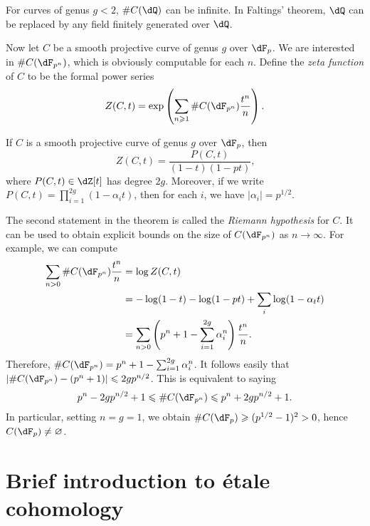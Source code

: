 \documentclass{article}
\begin{document}
For curves of genus $g<2$, $\# C(\dQ)$ can be infinite. In Faltings' 
theorem, $\dQ$ can be replaced by any field finitely generated over 
$\dQ$. 

Now let $C$ be a smooth projective curve of genus $g$ over $\dF_p$. 
We are interested in $\#C(\dF_{p^n})$, which is obviously computable 
for each $n$. Define the \emph{zeta function} of $C$ to be the formal power 
series 
\[
  Z(C,t) = \exp\left( \sum_{n\geqslant 1} \# C(\dF_{p^n}) \frac{t^n}{n} \right) \text{.}
\]

\begin{theorem}[Weil]\label{thm:Weil-curve}
If $C$ is a smooth projective curve of genus $g$ over $\dF_p$, then 
\[
  Z(C,t) = \frac{P(C,t)}{(1-t)(1-p t)} \text{,}
\]
where $P(C,t)\in \dZ[t]$ has degree $2 g$. Moreover, if we write
$P(C,t) = \prod_{i=1}^{2 g} (1-\alpha_i t)$, then for each $i$, we have 
$|\alpha_i|=p^{1/2}$. 
\end{theorem}

The second statement in the theorem is called the \emph{Riemann hypothesis} 
for $C$. It can be used to obtain explicit bounds on the size of 
$C(\dF_{p^n})$ as $n\to\infty$. For example, we can compute 
\begin{align*}
  \sum_{n>0} \# C(\dF_{p^n}) \frac{t^n}{n} 
    &= \log Z(C,t) \\
    &= -\log(1-t) - \log(1-p t) + \sum_i \log(1-\alpha_t t) \\
    &= \sum_{n>0} \left(p^n+1-\sum_{i=1}^{2 g} \alpha_i^n\right) \frac{t^n}{n} \text{.}
\end{align*}
Therefore, $\# C(\dF_{p^n}) = p^n+1-\sum_{i=1}^{2 g} \alpha_i^n$. It 
follows easily that $|\# C(\dF_{p^n})-(p^n+1)| \leqslant 2 g p^{n/2}$. 
This is equivalent to saying 
\[
  p^n-2 g p^{n/2}+1 
    \leqslant \# C(\dF_{p^n}) 
    \leqslant p^n + 2 g p^{n/2} + 1 \text{.}
\]
In particular, setting $n = g = 1$, we obtain 
$\# C(\dF_p) \geqslant (p^{1/2}-1)^2>0$, hence 
$C(\dF_p)\ne\varnothing$. 

























\appendix
\section{Brief introduction to \'etale cohomology}
\end{document}
